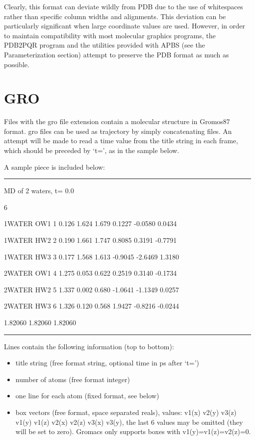 \documentclass[letterpaper,10pt,english]{sphinxmanual}
\begin{document}
Clearly, this format can deviate wildly from PDB due to the use of whitespaces
rather than specific column widths and alignments. This deviation can be
particularly significant when large coordinate values are used. However, in order
to maintain compatibility with most molecular graphics programs, the PDB2PQR
program and the utilities provided with APBS (see the Parameterization section)
attempt to preserve the PDB format as much as possible.


\section{GRO}
\label{documentation_pages/file_format:gro}
Files with the gro file extension contain a molecular structure in Gromos87 format. gro files
can be used as trajectory by simply concatenating files. An attempt will be made to read a
time value from the title string in each frame, which should be preceded by `t=', as in the
sample below.

A sample piece is included below:


\bigskip\hrule{}\bigskip


MD of 2 waters, t= 0.0

6

1WATER  OW1    1   0.126   1.624   1.679  0.1227 -0.0580  0.0434

1WATER  HW2    2   0.190   1.661   1.747  0.8085  0.3191 -0.7791

1WATER  HW3    3   0.177   1.568   1.613 -0.9045 -2.6469  1.3180

2WATER  OW1    4   1.275   0.053   0.622  0.2519  0.3140 -0.1734

2WATER  HW2    5   1.337   0.002   0.680 -1.0641 -1.1349  0.0257

2WATER  HW3    6   1.326   0.120   0.568  1.9427 -0.8216 -0.0244

1.82060   1.82060   1.82060


\bigskip\hrule{}\bigskip


Lines contain the following information (top to bottom):
\begin{itemize}
\item {} 
title string (free format string, optional time in ps after `t=')

\item {} 
number of atoms (free format integer)

\item {} 
one line for each atom (fixed format, see below)

\item {} 
box vectors (free format, space separated reals), values: v1(x) v2(y) v3(z)
v1(y) v1(z) v2(x) v2(z) v3(x) v3(y), the last 6 values may be omitted (they will
be set to zero). Gromacs only supports boxes with v1(y)=v1(z)=v2(z)=0.

\end{itemize}
\end{document}
